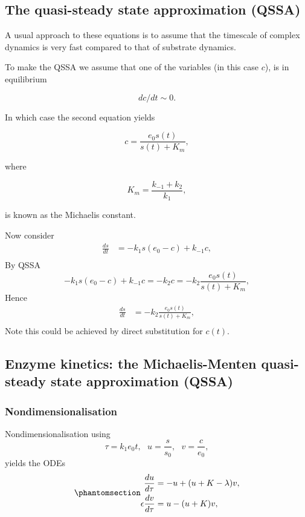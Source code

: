 \documentclass[
  letterpaper,
  DIV=11,
  numbers=noendperiod]{scrreprt}
\begin{document}
\subsection{The quasi-steady state approximation
(QSSA)}\label{the-quasi-steady-state-approximation-qssa}

A usual approach to these equations is to assume that the timescale of
complex dynamics is very fast compared to that of substrate dynamics.

To make the QSSA we assume that one of the variables (in this case
\(c\)), is in equilibrium

\[
dc/dt \sim 0.
\]

In which case the second equation yields

\[
c=\frac{e_0s(t)}{s(t)+K_m}, 
\]

where

\[
 K_m=\frac{k_{-1}+k_2}{k_1},
\]

is known as the Michaelis constant.

Now consider \[
\begin{aligned}
\frac{d s}{dt} &= -k_1 s(e_0-c) + k_{-1}c, \nonumber \\
\end{aligned}
\] By QSSA \[
-k_1 s(e_0-c) + k_{-1}c=-k_2c=-k_2\frac{e_0s(t)}{s(t)+K_m},
\] Hence \[
\begin{aligned}
\frac{d s}{dt} &= -k_2\frac{e_0s(t)}{s(t)+K_m}, \nonumber \\
\end{aligned}
\] Note this could be achieved by direct substitution for \(c(t)\).

\subsection{Enzyme kinetics: the Michaelis-Menten quasi-steady state
approximation
(QSSA)}\label{enzyme-kinetics-the-michaelis-menten-quasi-steady-state-approximation-qssa}

\subsubsection{Nondimensionalisation}\label{nondimensionalisation-6}

Nondimensionalisation using \[
\tau=k_1 e_0 t, \ \ \ u=\frac{s}{s_0}, \ \ \ v=\frac{c}{e_0},
\] yields the ODEs
\begin{equation}\protect\phantomsection\label{eq-mmenten2varnondim}{
\begin{aligned}
\frac{d u}{d\tau} &= -u+(u+K-\lambda)v, \nonumber \\
\epsilon \frac{d v}{d\tau} &= u-(u+K)v, \nonumber \\
\end{aligned}
}\end{equation}
\end{document}
